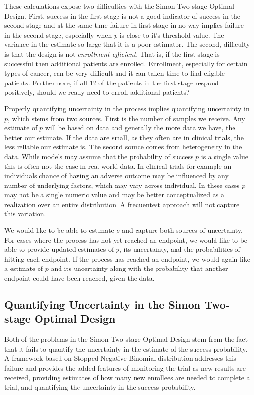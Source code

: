 \documentclass[12pt]{article}         %
\begin{document}
These calculations expose two difficulties with the Simon Two-stage Optimal Design. First, success in the first stage is not a good indicator of success in the second stage and at the same time failure in first stage in no way implies failure in the second stage, especially when $p$ is close to it's threshold value. The variance in the estimate so large that it is a poor estimator. The second, difficulty is that the design is not {\em enrollment efficient}. That is, if the first stage is successful then additional patients are enrolled. Enrollment, especially for certain types of cancer, can be very difficult and it can taken time to find eligible patients. Furthermore, if all 12 of the patients in the first stage respond positively, should we really need to enroll additional patients?

Properly quantifying uncertainty in the process implies quantifying uncertainty in $p$, which stems from two sources. First is the number of samples we receive. Any estimate of $p$ will be based on data and generally the more data we have, the better our estimate. If the data are small, as they often are in clinical trials, the less reliable our estimate is. The second source comes from heterogeneity in the data. While models may assume that the probability of success $p$ is a single value this is often not the case in real-world data. In clinical trials for example an individuals chance of having an adverse outcome may be influenced by any number of underlying factors, which may vary across individual. In these cases $p$ may not be a single numeric value and may be better conceptualized as a realization over an entire distribution. A frequentest approach will not capture this variation.

We would like to be able to estimate $p$ and capture both sources of uncertainty. For cases where the process has not yet reached an endpoint, we would like to be able to provide updated estimates of $p$, its uncertainty, and the probabilities of hitting each endpoint. If the process has reached an endpoint, we would again like a estimate of $p$ and its uncertainty along with the probability that another endpoint could have been reached, given the data. 

\subsection{Quantifying Uncertainty in the Simon Two-stage Optimal Design}

Both of the problems in the Simon Two-stage Optimal Design stem from the fact that it fails to quantify the uncertainty in the estimate of the success probability. A framework based on Stopped Negative Binomial distribution addresses this failure and provides the added features of monitoring the trial as new results are received, providing estimates of how many new enrollees are needed to complete a trial, and quantifying the uncertainty in the success probability.
\end{document}

